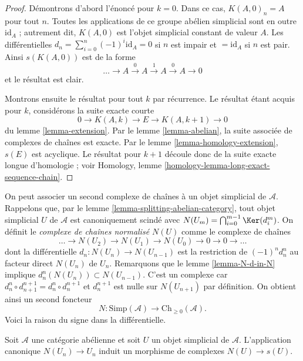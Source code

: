 \begin{proof}
Démontrons d'abord l'énoncé pour $k = 0$. Dans ce cas,
$K(A, 0)_n = A$ pour tout $n$. Toutes les applications de ce groupe
abélien simplicial sont en outre $\text{id}_A$ ; autrement dit,
$K(A, 0)$ est l'objet simplicial constant de valeur $A$. Les
différentielles $d_n = \sum_{i = 0}^n (-1)^i \text{id}_A = 0$ si $n$
est impair et $ = \text{id}_A$ si $n$ est pair. Ainsi $s(K(A, 0))$ est
de la forme
$$
\ldots \to A \xrightarrow{0} A \xrightarrow{1} A \xrightarrow{0} A \to 0
$$
et le résultat est clair.

\medskip\noindent
Montrons ensuite le résultat pour tout $k$ par récurrence. Le résultat
étant acquis pour $k$, considérons la suite exacte courte
$$
0 \to K(A, k) \to E \to K(A, k + 1) \to 0
$$
du lemme \ref{lemma-extension}. Par le lemme \ref{lemma-abelian}, la
suite associée de complexes de chaînes est exacte. Par le lemme
\ref{lemma-homology-extension}, $s(E)$ est acyclique. Le résultat pour
$k + 1$ découle donc de la suite exacte longue d'homologie ; voir
Homology, lemme \ref{homology-lemma-long-exact-sequence-chain}.
\end{proof}

\noindent
On peut associer un second complexe de chaînes à un objet simplicial de
$\mathcal{A}$. Rappelons que, par le lemme
\ref{lemma-splitting-abelian-category}, tout objet simplicial $U$ de
$\mathcal{A}$ est canoniquement scindé avec
$N(U_m) = \bigcap_{i = 0}^{m - 1} \Ker(d^m_i)$.
On définit le {\it complexe de chaînes normalisé $N(U)$} comme le
complexe de chaînes
$$
\ldots \to N(U_2) \to N(U_1) \to N(U_0) \to 0 \to 0 \to \ldots
$$
dont la différentielle $d_n : N(U_n) \to N(U_{n - 1})$ est la restriction
de $(-1)^nd^n_n$ au facteur direct $N(U_n)$ de $U_n$. Remarquons que le
lemme \ref{lemma-N-d-in-N} implique
$d^n_n(N(U_n)) \subset N(U_{n - 1})$. C'est un complexe car
$d^n_n \circ d^{n + 1}_{n + 1} = d^n_n \circ d^{n + 1}_n$
et $d^{n + 1}_n$ est nulle sur $N(U_{n + 1})$ par définition. On obtient
ainsi un second foncteur
$$
N : \text{Simp}(\mathcal{A}) \longrightarrow \text{Ch}_{\geq 0}(\mathcal{A}).
$$
Voici la raison du signe dans la différentielle.

\begin{lemma}
\label{lemma-map-associated-complexes}
Soit $\mathcal{A}$ une catégorie abélienne et soit $U$ un objet
simplicial de $\mathcal{A}$. L'application canonique $N(U_n) \to U_n$
induit un morphisme de complexes $N(U) \to s(U)$.
\end{lemma}

